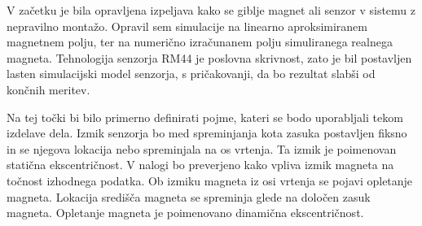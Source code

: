 V začetku je bila opravljena  izpeljava kako se giblje magnet ali senzor v sistemu z nepravilno montažo. Opravil sem simulacije na linearno aproksimiranem magnetnem polju, ter na numerično izračunanem polju simuliranega realnega magneta.
Tehnologija senzorja RM44 je poslovna skrivnost, zato je bil postavljen lasten simulacijski model senzorja, s pričakovanji, da bo rezultat  slabši od končnih meritev.

Na tej točki bi bilo primerno definirati pojme, kateri se bodo uporabljali tekom izdelave dela.
Izmik senzorja bo med spreminjanja kota zasuka postavljen fiksno in se njegova lokacija nebo spreminjala na os vrtenja. Ta izmik je poimenovan statična ekscentričnost.
V nalogi bo preverjeno kako vpliva izmik magneta na točnost izhodnega podatka. Ob izmiku magneta iz osi vrtenja se pojavi opletanje magneta. Lokacija središča magneta se spreminja glede na določen zasuk magneta. Opletanje magneta je poimenovano dinamična ekscentričnost.














%
%
%
%
%
